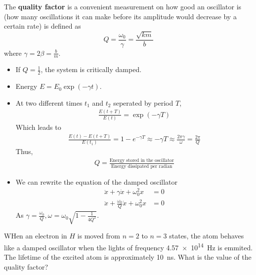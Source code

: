 \documentclass[a4paper]{article}
\numberwithin{equation}{section}
\begin{document}
\begin{definition}
    The \textbf{quality factor} is a convenient measurement on how good an oscillator is (how many oscillations it can make before its amplitude would decrease by a certain rate) is defined as 
    \begin{equation}
        Q=\frac{\omega_0}{\gamma}=\frac{\sqrt{km}}{b}
    \end{equation}
    where $\gamma=2\beta=\frac{b}{m}$.
\end{definition}
\begin{itemize}
    \item If $Q=\frac{1}{2}$, the system is critically damped.
    \item Energy $E=E_0\exp(-\gamma t)$.
    \item At two different times $t_1$ and $t_2$ seperated by period $T$, 
    \begin{align}
        \frac{E(t+T)}{E(t)}=\exp(-\gamma T)
    \end{align}
    Which leads to
    \begin{align}
        \frac{E(t)-E(t+T)}{E(t_1)}=1-e^{-\gamma T}\approx -\gamma T\approx\frac{2\pi\gamma}{\omega}=\frac{2\pi}{Q}
    \end{align}
    Thus,
    \begin{align}
        Q=\frac{\text{Energy stored in the oscillator}}{\text{Energy dissipated per radian}}
    \end{align}
    \item We can rewrite the equation of the damped oscillator
    \begin{align}
        \ddot x+\gamma\dot x+\omega_0^2 x&=0\\
        \ddot x+\frac{\omega_0}{Q}\dot x+\omega_0^2 x&=0
    \end{align}
    As $\displaystyle{\gamma=\frac{\omega_0}{Q}, \omega=\omega_0\sqrt{1-\frac{1}{4Q^2}}}$.
    \begin{center}
    \end{center}
\end{itemize}
\begin{example}
    WHen an electron in $H$ is moved from $n=2$ to $n=3$ states, the atom behaves like a damped oscillator when the lights of frequency \SI{4.57e+14}{\hertz} is emmited. The lifetime of the excited atom is approximately \SI{10}{\nano\second}. What is the value of the quality factor?
\end{example}
\end{document}
